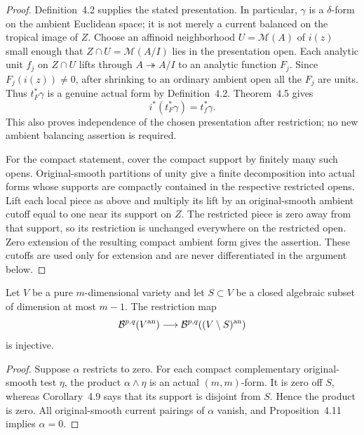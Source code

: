 \begin{proof}
Definition~4.2 supplies the stated presentation. In particular,
$\gamma$ is a $\delta$-form on the ambient Euclidean space; it is
not merely a current balanced on the tropical image of $Z$.
Choose an affinoid neighborhood $U=\mathcal M(A)$ of $i(z)$
small enough that $Z\cap U=\mathcal M(A/I)$ lies in the
presentation open. Each analytic unit $f_j$ on $Z\cap U$ lifts
through $A\twoheadrightarrow A/I$ to an analytic function $F_j$.
Since $F_j(i(z))\ne0$, after shrinking to an ordinary ambient
open all the $F_j$ are units. Thus $t_F^*\gamma$ is a genuine
actual form by Definition~4.2. Theorem~4.5 gives
\[
                    i^*(t_F^*\gamma)=t_f^*\gamma.
\]
This also proves independence of the chosen presentation after
restriction; no new ambient balancing assertion is required.

For the compact statement, cover the compact support by finitely
many such opens. Original-smooth partitions of unity give a finite
decomposition into actual forms whose supports are compactly
contained in the respective restricted opens. Lift each local
piece as above and multiply its lift by an original-smooth ambient
cutoff equal to one near its support on $Z$. The restricted piece
is zero away from that support, so its restriction is unchanged
everywhere on the restricted open. Zero extension of the resulting
compact ambient form gives the assertion. These cutoffs are used
only for extension and are never differentiated in the argument
below.
\end{proof}

\begin{lemma}
\label{g10t:dense-restriction}
Let $V$ be a pure $m$-dimensional variety and let $S\subset V$
be a closed algebraic subset of dimension at most $m-1$.
The restriction map
\[
        \mathcal B^{p,q}(V^{\rm an})
          \longrightarrow
        \mathcal B^{p,q}((V\setminus S)^{\rm an})
\]
is injective.
\end{lemma}

\begin{proof}
Suppose $\alpha$ restricts to zero. For each compact complementary
original-smooth test $\eta$, the product $\alpha\wedge\eta$ is
an actual $(m,m)$-form. It is zero off $S$, whereas Corollary~4.9
says that its support is disjoint from $S$. Hence the product is
zero. All original-smooth current pairings of $\alpha$ vanish,
and Proposition~4.11 implies $\alpha=0$.
\end{proof}


